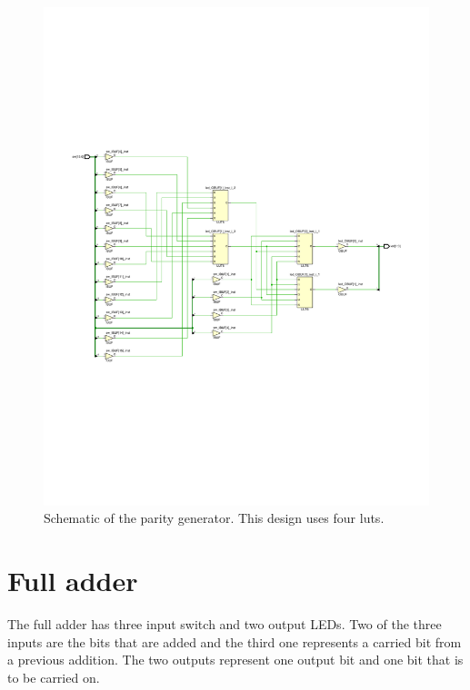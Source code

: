 \begin{figure}[h]
	\centering
	\includegraphics[width=\linewidth, trim=0mm 80mm 0mm 80mm]{./L1/E3/schematic.pdf}
	\caption{Schematic of the parity generator. This design uses four \glspl{lut}.}
	\label{fig: Parity Generator schematic}
\end{figure}



\section{Full adder}

The full adder has three input switch and two output LEDs. Two of the three inputs are the bits that are added and the third one represents a carried bit from a previous addition. The two outputs represent one output bit and one bit that is to be carried on. 

